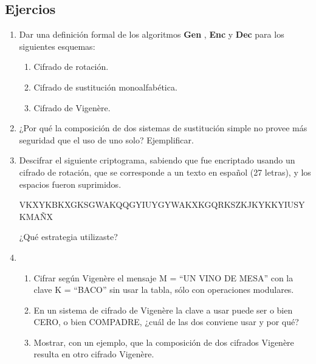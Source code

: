 \documentclass[]{book}
\theoremstyle{definition}
\begin{document}
\subsection*{Ejercios}
\begin{enumerate}
\item\label{norms}
  Dar una definición formal de los algoritmos \textbf{Gen} , \textbf{Enc} y
  \textbf{Dec} para los siguientes esquemas: 
\begin{enumerate}
  \item Cifrado de rotación.
  \item Cifrado de sustitución monoalfabética.
  \item Cifrado de Vigenère.
\end{enumerate}

\item ¿Por qué la composición de dos sistemas de sustitución simple no provee más seguridad que el uso de uno solo? Ejemplificar. 

\item Descifrar el siguiente criptograma, sabiendo que fue encriptado usando un
  cifrado de rotación, que se corresponde a un texto en español (27 letras), y
  los espacios fueron suprimidos.
  
\begin{center}
VKXYKBKXGKSGWAKQQGYIUYGYWAKXKGQRKSZKJKYKKYIUSYKMAÑX
\end{center}
¿Qué estrategia utilizaste? 

\item 
  \begin{enumerate}
    \item Cifrar según Vigenère el mensaje M = ``UN VINO DE MESA'' con la clave
      K = ``BACO'' sin usar la tabla, sólo con operaciones modulares.
    \item En un sistema de cifrado de Vigenère la clave a usar puede ser o bien CERO, o bien COMPADRE, ¿cuál de las dos conviene usar y por qué?
    \item Mostrar, con un ejemplo, que la composición de dos cifrados Vigenère resulta en otro cifrado Vigenère.
  \end{enumerate}


\end{enumerate}
\end{document}
